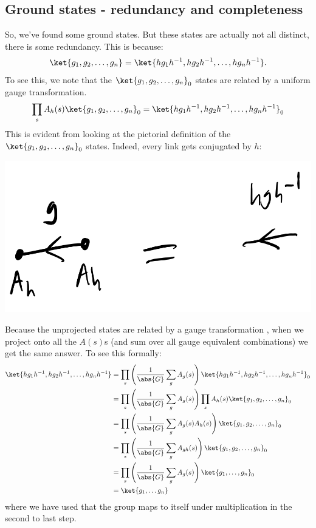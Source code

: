 \subsection{Ground states - redundancy and completeness}
So, we've found some ground states. But these states are actually not all distinct, there is some redundancy. This is because:
\begin{equation}
    \ket{g_1, g_2, \ldots, g_n} = \ket{hg_1h^{-1}, hg_2h^{-1}, \ldots, hg_nh^{-1}}.
\end{equation}
To see this, we note that the $\ket{g_1, g_2, \ldots, g_n}_0$ states are related by a uniform gauge transformation.
\begin{equation}
    \prod_s A_h(s)\ket{g_1, g_2, \ldots, g_n}_0 = \ket{hg_1h^{-1}, hg_2h^{-1}, \ldots, hg_nh^{-1}}_0
\end{equation}
This is evident from looking at the pictorial definition of the $\ket{g_1, g_2, \ldots, g_n}_0$ states. Indeed, every link gets conjugated by $h$:

\begin{center}
    \includegraphics[scale=0.35]{Lectures/Images/lec9-gauging.png}
\end{center}

Because the unprojected states are related by a gauge transformation , when we project onto all the $A(s)$s (and sum over all gauge equivalent combinations) we get the same answer. To see this formally:
\begin{equation}
    \begin{split}
        \ket{hg_1h^{-1}, hg_2h^{-1}, \ldots, hg_nh^{-1}} &= \prod_s\left(\frac{1}{\abs{G}}\sum_g A_g(s)\right)\ket{hg_1h^{-1}, hg_2h^{-1}, \ldots, hg_nh^{-1}}_0
        \\ &= \prod_s\left(\frac{1}{\abs{G}}\sum_g A_g(s)\right)\prod_{s}A_h(s) \ket{g_1, g_2, \ldots, g_n}_0
        \\ &= \prod_{s}\left(\frac{1}{\abs{G}}\sum_g A_g(s)A_h(s) \right)\ket{g_1, g_2, \ldots, g_n}_0
        \\ &= \prod_{s}\left(\frac{1}{\abs{G}}\sum_g A_{gh}(s) \right)\ket{g_1, g_2, \ldots, g_n}_0
        \\ &= \prod_s \left(\frac{1}{\abs{G}}\sum_g A_g(s)\right)\ket{g_1, \ldots, g_n}_0
        \\ &= \ket{g_1, \ldots g_n}
    \end{split}
\end{equation}
where we have used that the group maps to itself under multiplication in the second to last step.

